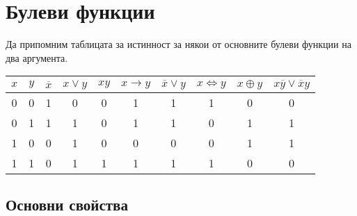\chapter{Булеви функции}

Да припомним таблицата за истинност за някои от основните булеви функции на два аргумента.

\begin{tabular}{|c|c|c|c|c|c|c|c|c|c|}
  \hline
  $x$ & $y$ & $\overline{x}$ & $x \vee y$ & $xy$ & $x \rightarrow y$ & $\overline{x}\vee y$ & $x \iff y$ & $x \oplus y$ & $x\overline{y} \vee \overline{x}y$\\
  \hline
  0 & 0 & 1 & 0 & 0 & 1 & 1 & 1 & 0 & 0 \\
  \hline
  0 & 1 & 1 & 1 & 0 & 1 & 1 & 0 & 1 & 1 \\
  \hline
  1 & 0 & 0 & 1 & 0 & 0 & 0 & 0 & 1 & 1 \\
  \hline
  1 & 1 & 0 & 1 & 1 & 1 & 1 & 1 & 0 & 0 \\
  \hline
\end{tabular}

\section{Основни свойства}

